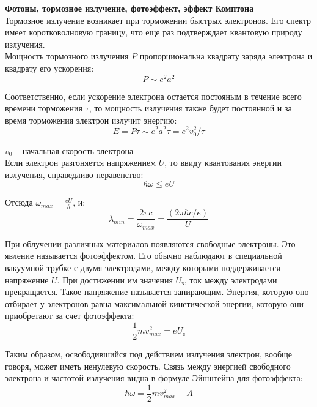 \documentclass{article}
\begin{document}
	\textbf{Фотоны, тормозное излучение, фотоэффект, эффект Комптона}\\

	Тормозное излучение возникает при торможении быстрых электронов. Его спектр имеет коротковолновую границу, что еще раз подтверждает квантовую природу излучения.\\

	Мощность тормозного излучения $P$ пропорциональна квадрату заряда электрона и квадрату его ускорения:
	\begin{equation}
		P\sim e^2 a^2
	\end{equation}

	Соответственно, если ускорение электрона остается постояным в течение всего времени торможения $\tau$, то мощность излучения также будет постоянной и за время торможения электрон излучит энергию:
	\begin{equation}
		E = P\tau \sim e^2a^2\tau = e^2 v_0^2 / \tau
	\end{equation}

	$v_0$ -- начальная скорость электрона\\

	Если электрон разгоняется напряжением $U$, то ввиду квантования энергии излучения, справедливо неравенство:
	\begin{equation}
		\hbar\omega \leq eU
	\end{equation}

	Отсюда $\omega_{max} = \frac{eU}{\hbar}$, и:
	\begin{equation}
		\lambda_{min} = \frac{2\pi c}{\omega_{max}} = \frac{(2\pi\hbar c/e)}{U}
	\end{equation}

	При облучении различных материалов появляются свободные электроны. Это явление называется фотоэффектом. Его обычно наблюдают в специальной вакуумной трубке с двумя электродами, между которыми поддерживается напряжение $U$. При достижении им значения $U_\text{з}$, ток между электродами прекращается. Такое напряжение называется запирающим. Энергия, которую оно отбирает у электронов равна максимальной кинетической энергии, которую они приобретают за счет фотоэффекта:
	\begin{equation}
		\frac{1}{2}mv_{max}^2 = eU_\text{з} 
	\end{equation}

	Таким образом, освободившийся под действием излучения электрон, вообще говоря, может иметь ненулевую скорость. Связь между энергией свободного электрона и частотой излучения видна в формуле Эйнштейна для фотоэффекта:
	\begin{equation}
		\hbar\omega = \frac{1}{2}mv_{max}^2 + A
	\end{equation}
\end{document}
